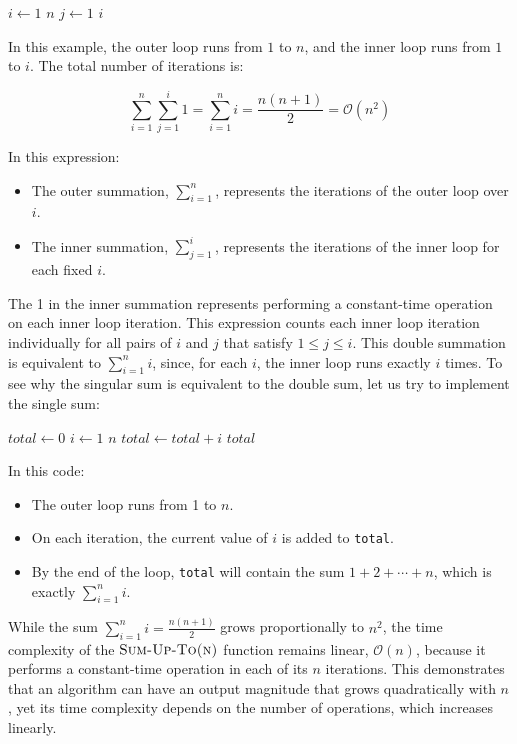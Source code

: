 \begin{example}

    \begin{codebox}
        \li \For $i \gets 1$ \To $n$ \Do
        \li     \For $j \gets 1$ \To $i$ \Do
        \li         {}
                \End
            \End
    \end{codebox}

In this example, the outer loop runs from $1$ to $n$, and the inner loop runs from $1$ to $i$. The total number of iterations is:

    \[
        \sum_{i=1}^n \sum_{j=1}^i 1 = \sum_{i=1}^{n} i = \frac{n(n + 1)}{2} = \mathcal{O}(n^2)
    \]

In this expression:
\begin{itemize}
    \item The outer summation, $\sum_{i=1}^n$, represents the iterations of the outer loop over $i$.
    \item The inner summation, $\sum_{j=1}^i$, represents the iterations of the inner loop for each fixed $i$.
\end{itemize}

The 1 in the inner summation represents performing a constant-time operation on each inner loop iteration. This expression counts each inner loop iteration individually for all pairs of $i$ and $j$ that satisfy $1 \leq j \leq i$. This double summation is equivalent to $\sum_{i=1}^n i$, since, for each $i$, the inner loop runs exactly $i$ times. To see why the singular sum is equivalent to the double sum, let us try to implement the single sum:

\begin{codebox}
    \li $total \gets 0$
    \li \For $i \gets 1$ \To $n$ \Do
    \li     $total \gets total + i$
        \End
    \li \Return $total$
\end{codebox}

In this code:

\begin{itemize}
    \item The outer loop runs from 1 to $n$.
    \item On each iteration, the current value of $i$ is added to \texttt{total}.
    \item By the end of the loop, \texttt{total} will contain the sum $1+2+\cdots+n$, which is exactly $\sum_{i=1}^n i$.
\end{itemize}

While the sum \( \sum_{i=1}^n i = \frac{n(n + 1)}{2} \) grows proportionally to \( n^2 \), the time complexity of the $\proc{Sum-Up-To(n)}$ function remains linear, \( \mathcal{O}(n) \), because it performs a constant-time operation in each of its \( n \) iterations. This demonstrates that an algorithm can have an output magnitude that grows quadratically with \( n \), yet its time complexity depends on the number of operations, which increases linearly.

\end{example}

